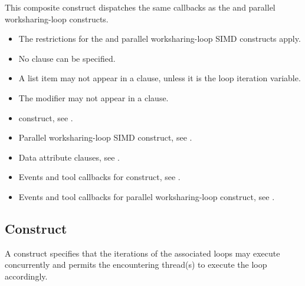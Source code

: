 \tools

This composite construct dispatches the same callbacks as the  and parallel worksharing-loop constructs.

\restrictions
\begin{itemize}
\item The restrictions for the  and parallel worksharing-loop SIMD constructs apply.
\item No  clause can be specified.
\item A list item may not appear in a  clause, unless it is the loop iteration variable.
\item The  modifier may not appear in a  clause.
\end{itemize}

\crossreferences
\begin{itemize}
\item {} construct, see
.

\item Parallel worksharing-loop SIMD construct, see
.

\item Data attribute clauses, see .

\item Events and tool callbacks for  construct, see
.

\item Events and tool callbacks for parallel worksharing-loop construct, see
.

\end{itemize}


\subsection{ Construct}
\label{subsec:loop Construct}
\summary
  A  construct specifies that the iterations of the associated
  loops may execute concurrently and permits the encountering thread(s) to
  execute the loop accordingly.


